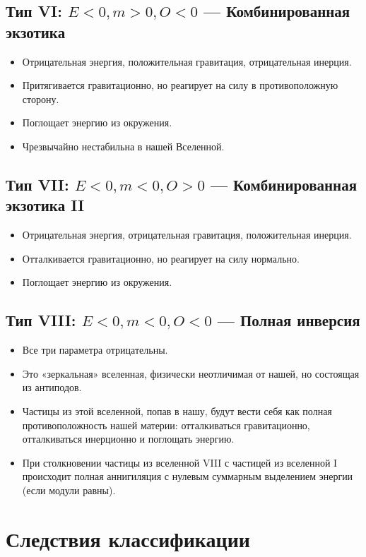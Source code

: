 \documentclass[12pt,a4paper]{article}
\begin{document}
\subsection{Тип VI: $E < 0, m > 0, O < 0$ --- Комбинированная экзотика}
\begin{itemize}
    \item Отрицательная энергия, положительная гравитация, отрицательная инерция.
    \item Притягивается гравитационно, но реагирует на силу в противоположную сторону.
    \item Поглощает энергию из окружения.
    \item Чрезвычайно нестабильна в нашей Вселенной.
\end{itemize}

\subsection{Тип VII: $E < 0, m < 0, O > 0$ --- Комбинированная экзотика II}
\begin{itemize}
    \item Отрицательная энергия, отрицательная гравитация, положительная инерция.
    \item Отталкивается гравитационно, но реагирует на силу нормально.
    \item Поглощает энергию из окружения.
\end{itemize}

\subsection{Тип VIII: $E < 0, m < 0, O < 0$ --- Полная инверсия}
\begin{itemize}
    \item Все три параметра отрицательны.
    \item Это «зеркальная» вселенная, физически неотличимая от нашей, но состоящая из антиподов.
    \item Частицы из этой вселенной, попав в нашу, будут вести себя как полная противоположность нашей материи: отталкиваться гравитационно, отталкиваться инерционно и поглощать энергию.
    \item При столкновении частицы из вселенной VIII с частицей из вселенной I происходит полная аннигиляция с нулевым суммарным выделением энергии (если модули равны).
\end{itemize}

\section{Следствия классификации}
\end{document}
